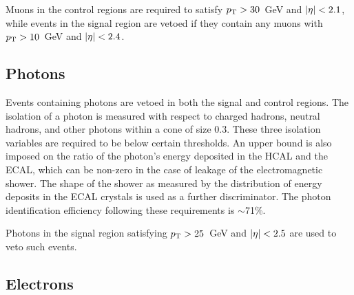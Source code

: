Muons in the control regions are required to satisfy {${p_{\text T}}>30$~GeV} and 
{$|\eta|<2.1$}, while events in the signal region are vetoed if they contain 
any muons with {${p_{\text T}}>10$~GeV} and {$|\eta|<2.4$}. 

\subsection*{Photons}



Events containing photons are vetoed in both the signal and control regions. 
The isolation of a photon is measured with respect to charged 
hadrons, neutral hadrons, and other photons within a \detadphi cone of size 
$0.3$. These three isolation variables are required to be below certain 
thresholds. 
An upper bound is also imposed on the ratio of the photon's energy deposited in 
the HCAL and the ECAL, which can be non-zero in the case of leakage of the 
electromagnetic shower. The shape of the shower as measured by the distribution 
of energy deposits in the ECAL crystals is used as a further discriminator. 
The photon identification efficiency following these requirements is 
$\sim$71\%. 


Photons in the signal region satisfying ${p_{\text T}}>25$~GeV and $|\eta|<2.5$ are used 
to veto such events.

\subsection*{Electrons}

